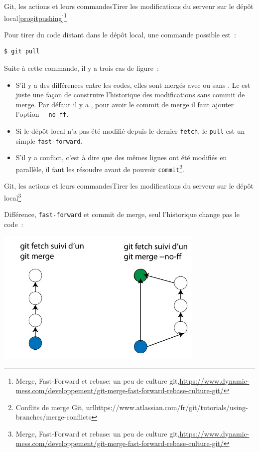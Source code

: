 \documentclass{beamer}
\begin{document}
    \begin{frame}[fragile]{Git, les actions et leurs commandes}{Tirer les modifications du serveur sur le dépôt local\cref{progitpushing}\footnote{Merge, Fast-Forward et rebase: un peu de culture git,\url{https://www.dynamic-mess.com/developpement/git-merge-fast-forward-rebase-culture-git/}}}
        \transdissolve

        Pour tirer du code distant dans le dépôt local, une commande possible est~:
        \begin{lstlisting}[language=sh]
$ git pull
        \end{lstlisting}

        Suite à cette commande, il y a trois cas de figure~:
        \begin{itemize}
            \item S'il y a des différences entre les codes, elles sont mergés avec ou sans .
            Le  est juste une façon de construire l'historique des modifications sans commit de merge.
            Par défaut il y a , pour avoir le commit de merge il faut ajouter l'option \lstinline{--no-ff}.
            \item Si le dépôt local n'a pas été modifié depuis le dernier \lstinline{fetch}, le \lstinline{pull} est un simple \lstinline{fast-forward}.
            \item S'il y a conflict, c'est à dire que des mêmes lignes ont été modifiés en parallèle, il faut les résoudre avant de pouvoir \lstinline{commit}\footnote{Conflits de merge Git, url{https://www.atlassian.com/fr/git/tutorials/using-branches/merge-conflicts}}.
        \end{itemize}
    \end{frame}

    \begin{frame}{Git, les actions et leurs commandes}{Tirer les modifications du serveur sur le dépôt local\footnote{Merge, Fast-Forward et rebase: un peu de culture git,\url{https://www.dynamic-mess.com/developpement/git-merge-fast-forward-rebase-culture-git/}}}
        \transdissolve

        Différence, \lstinline{fast-forward} et commit de merge, seul l'historique change pas le code~:
        \begin{center}
            \includegraphics[width=10cm]{image/fast-forward-merge}
        \end{center}
    \end{frame}
\end{document}
